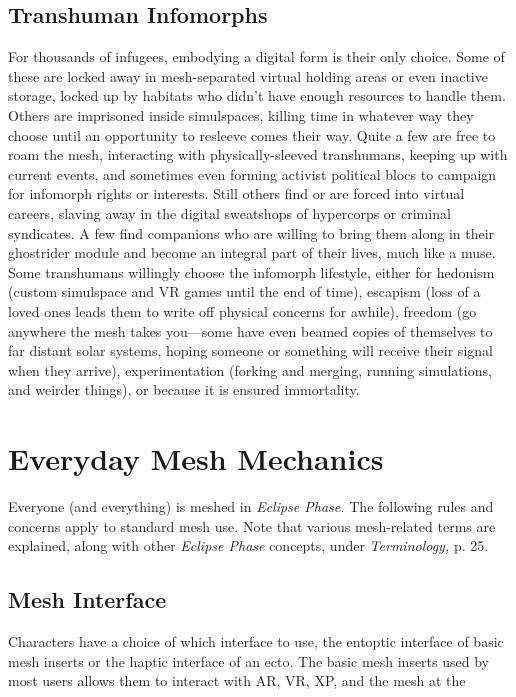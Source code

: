 \subsection{Transhuman Infomorphs} 

For thousands of infugees, embodying a digital form is their only choice. Some of these are locked away in mesh-separated virtual holding areas or even inactive storage, locked up by habitats who didn't have enough resources to handle them. Others are imprisoned inside simulspaces, killing time in whatever way they choose until an opportunity to resleeve comes their way. Quite a few are free to roam the mesh, interacting with physically-sleeved transhumans, keeping up with current events, and sometimes even forming activist political blocs to campaign for infomorph rights or interests. Still others find or are forced into virtual careers, slaving away in the digital sweatshops of hypercorps or criminal syndicates. A few find companions who are willing to bring them along in their ghostrider module and become an integral part of their lives, much like a muse. Some transhumans willingly choose the infomorph lifestyle, either for hedonism (custom simulspace and VR games until the end of time), escapism (loss of a loved ones leads them to write off physical concerns for awhile), freedom (go anywhere the mesh takes you—some have even beamed copies of themselves to far distant solar systems, hoping someone or something will receive their signal when they arrive), experimentation (forking and merging, running simulations, and weirder things), or because it is ensured immortality. 

\section{Everyday Mesh Mechanics} 

Everyone (and everything) is meshed in \textit{Eclipse Phase. } The following rules and concerns apply to standard mesh use. Note that various mesh-related terms are explained, along with other \textit{Eclipse Phase }concepts, under \textit{Terminology,} p. 25. 

\subsection{Mesh Interface} 

Characters have a choice of which interface to use, the entoptic interface of basic mesh inserts or the haptic interface of an ecto. The basic mesh inserts used by most users allows them to interact with AR, VR, XP, and the mesh at the 

